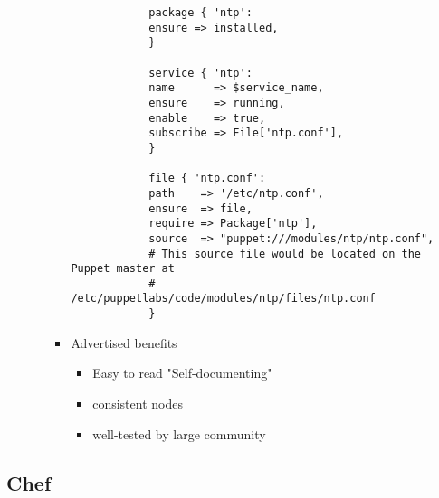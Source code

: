 \begin{itemize}
\begin{itemize}
\begin{itemize}
\begin{verbatim}
			package { 'ntp':
			ensure => installed,
			}
			
			service { 'ntp':
			name      => $service_name,
			ensure    => running,
			enable    => true,
			subscribe => File['ntp.conf'],
			}
			
			file { 'ntp.conf':
			path    => '/etc/ntp.conf',
			ensure  => file,
			require => Package['ntp'],
			source  => "puppet:///modules/ntp/ntp.conf",
			# This source file would be located on the Puppet master at
			# /etc/puppetlabs/code/modules/ntp/files/ntp.conf
			}
			\end{verbatim}
			\item Advertised benefits
			\begin{itemize}
				\item Easy to read "Self-documenting"
				\item consistent nodes
				\item well-tested by large community
			\end{itemize}
		\end{itemize}
	\end{itemize}
\end{itemize}


\subsection{Chef}

